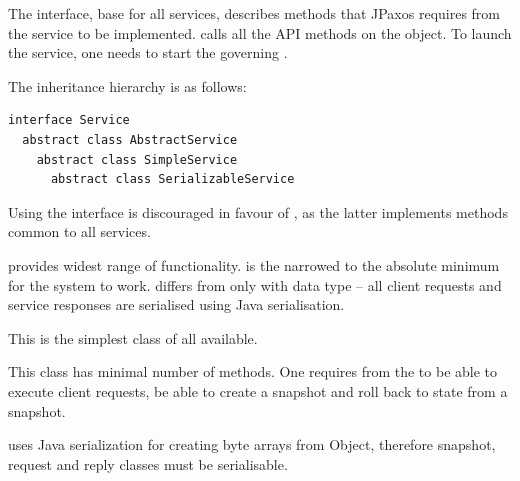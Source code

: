 The  interface, base for all services, describes methods that JPaxos requires from the service to be implemented.  calls all the API methods on the  object. To launch the service, one needs to start the governing .

\clearpage

The inheritance hierarchy is as follows:

\begin{Verbatim}[commandchars=@\[\]]
interface Service
  abstract class AbstractService
    abstract class SimpleService
      abstract class SerializableService
\end{Verbatim}

Using the  interface is discouraged in favour of , as the latter implements methods common to all services.

 provides widest range of functionality.  is the  narrowed to the absolute minimum for the system to work.  differs from  only with data type -- all client requests and service responses are serialised using Java serialisation.


\label{api:serializableservice-class}
This is the simplest class of all available.

This class has minimal number of methods. One requires from the  to be able to execute client requests, be able to create a snapshot and roll back to state from a snapshot.

 uses Java serialization for creating byte arrays from Object, therefore snapshot, request and reply classes must be serialisable.

